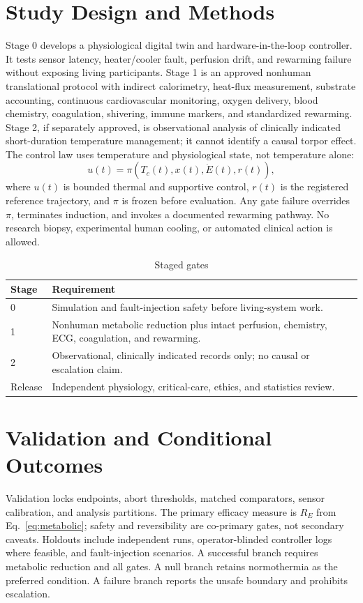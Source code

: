 \documentclass[conference]{IEEEtran}
\begin{document}
\section{Study Design and Methods}
Stage 0 develops a physiological digital twin and hardware-in-the-loop controller. It tests sensor latency, heater/cooler fault, perfusion drift, and rewarming failure without exposing living participants. Stage 1 is an approved nonhuman translational protocol with indirect calorimetry, heat-flux measurement, substrate accounting, continuous cardiovascular monitoring, oxygen delivery, blood chemistry, coagulation, shivering, immune markers, and standardized rewarming. Stage 2, if separately approved, is observational analysis of clinically indicated short-duration temperature management; it cannot identify a causal torpor effect.
The control law uses temperature and physiological state, not temperature alone:
\begin{equation}\label{eq:control}
u(t)=\pi\left(T_c(t),x(t),\dot{E}(t),r(t)\right),
\end{equation}
where $u(t)$ is bounded thermal and supportive control, $r(t)$ is the registered reference trajectory, and $\pi$ is frozen before evaluation. Any gate failure overrides $\pi$, terminates induction, and invokes a documented rewarming pathway. No research biopsy, experimental human cooling, or automated clinical action is allowed.
\begin{table}[t]\caption{Staged gates}\centering\footnotesize\begin{tabular}{p{}p{}}\toprule Stage & Requirement \\\midrule 0 & Simulation and fault-injection safety before living-system work.\\ 1 & Nonhuman metabolic reduction plus intact perfusion, chemistry, ECG, coagulation, and rewarming.\\ 2 & Observational, clinically indicated records only; no causal or escalation claim.\\ Release & Independent physiology, critical-care, ethics, and statistics review.\\\bottomrule\end{tabular}\end{table}
\section{Validation and Conditional Outcomes}
Validation locks endpoints, abort thresholds, matched comparators, sensor calibration, and analysis partitions. The primary efficacy measure is $R_E$ from Eq.~\eqref{eq:metabolic}; safety and reversibility are co-primary gates, not secondary caveats. Holdouts include independent runs, operator-blinded controller logs where feasible, and fault-injection scenarios. A successful branch requires metabolic reduction and all gates. A null branch retains normothermia as the preferred condition. A failure branch reports the unsafe boundary and prohibits escalation.
\end{document}
